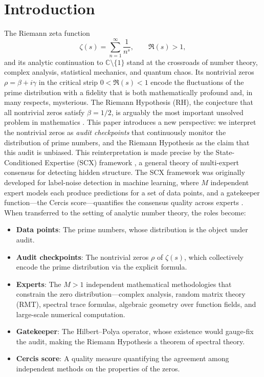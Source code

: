 \documentclass[12pt,a4paper]{article}
\theoremstyle{remark}
\newcommand{\C}{\mathbb{C}}
\begin{document}
\section{Introduction}
\label{sec:introduction}
The Riemann zeta function
\[
\zeta(s) = \sum_{n=1}^{\infty} \frac{1}{n^{s}},
\qquad \Re(s) > 1,
\]
and its analytic continuation to $\C\setminus\{1\}$ stand at the
crossroads of number theory, complex analysis, statistical mechanics, and
quantum chaos. Its nontrivial zeros $\rho = \beta + i\gamma$ in the critical
strip $0 < \Re(s) < 1$ encode the fluctuations of the prime distribution
with a fidelity that is both mathematically profound and, in many respects,
mysterious. The Riemann Hypothesis (RH), the conjecture that all nontrivial
zeros satisfy $\beta = 1/2$, is arguably the most important unsolved problem
in mathematics \cite{Bombieri2000, Conrey2003}.
This paper introduces a new perspective: we interpret the nontrivial zeros as
\emph{audit checkpoints} that continuously monitor the distribution of prime
numbers, and the Riemann Hypothesis as the claim that this audit is unbiased.
This reinterpretation is made precise by the State-Conditioned Expertise
(SCX) framework \cite{SCX2025, Yajie2025}, a general theory of multi-expert
consensus for detecting hidden structure.
The SCX framework was originally developed for label-noise detection in
machine learning, where $M$ independent expert models each produce
predictions for a set of data points, and a gatekeeper function---the Cercis
score---quantifies the consensus quality across experts
\cite{CercisBound2025}. When transferred to the setting of analytic number
theory, the roles become:
\begin{itemize}
  \item \textbf{Data points}: The prime numbers, whose distribution is the
        object under audit.
  \item \textbf{Audit checkpoints}: The nontrivial zeros $\rho$ of
        $\zeta(s)$, which collectively encode the prime distribution via
        the explicit formula.
  \item \textbf{Experts}: The $M > 1$ independent mathematical methodologies
        that constrain the zero distribution---complex analysis, random
        matrix theory (RMT), spectral trace formulas, algebraic geometry
        over function fields, and large-scale numerical computation.
  \item \textbf{Gatekeeper}: The Hilbert--Polya operator, whose existence
        would gauge-fix the audit, making the Riemann Hypothesis a
        theorem of spectral theory.
  \item \textbf{Cercis score}: A quality measure quantifying the agreement
        among independent methods on the properties of the zeros.
\end{itemize}
\end{document}
